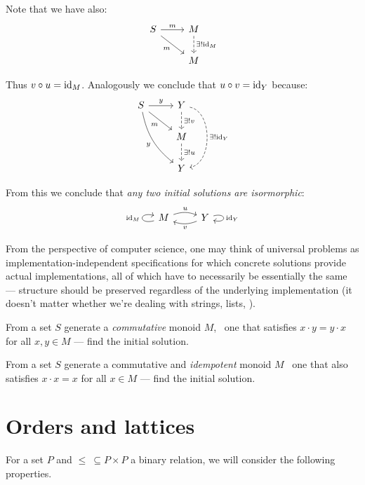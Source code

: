Note that we have also:
$$
\begin{tikzcd}
    S \arrow[r, "m"] \arrow[rd, swap, "m"] & 
    M \arrow[d, dashed, "\exists! \id{M}"] \\
    {} & M
\end{tikzcd}
$$

Thus $v \circ u = \mathrm{id}_{ M }$. Analogously we conclude that $u \circ v = \mathrm{id}_{ Y }$
because:
$$
\begin{tikzcd}
    S \arrow[r, "y"] \arrow[rd, swap, "m"]
    \arrow[rdd, swap, bend right = 20, "y"] & 
    Y \arrow[d, dashed, "\exists! v"]
    \arrow[dd, dashed, bend left = 80, "\exists! \id{Y}"] \\
    {} & M \arrow[d, dashed, "\exists! u"] \\
    {} & Y
\end{tikzcd}
$$

From this we conclude that \textit{any two initial solutions are isormorphic}:
$$
\begin{tikzcd}
    M \arrow[r, bend left = 20, "u"] \arrow[loop left, "\id{M}"] & 
    Y \arrow[l, bend left = 20, "v"] \arrow[loop right, "\id{Y}"]
\end{tikzcd}
$$

From the perspective of computer science, one may think of universal problems
as implementation-independent specifications for which concrete solutions
provide actual implementations, all of which have to necessarily be
essentially the same --- structure should be preserved regardless of the
underlying implementation (it doesn't matter whether we're dealing with
strings, lists, \etc).

\begin{exercise}
From a set $S$ generate a \textit{commutative} monoid $M$, \ie~one that
satisfies $x \cdot y = y \cdot x$ for all $x, y \in M$ --- find the initial
solution.
\end{exercise}

\begin{exercise}
From a set $S$ generate a commutative and \textit{idempotent} monoid $M$ \ie~one
that also satisfies $x \cdot x = x$ for all $x \in M$ --- find the initial
solution.
\end{exercise}

\section{Orders and lattices}

For a set $P$ and $\leq\ \subseteq P \times P$ a binary relation, we will
consider the following properties.

